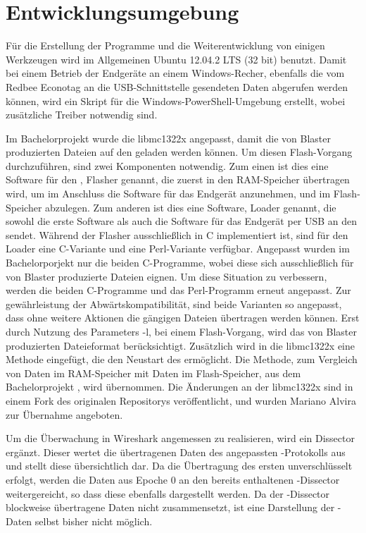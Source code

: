 \section{Entwicklungsumgebung}
\label{sec:entwicklungsumgebung}

Für die Erstellung der Programme und die Weiterentwicklung von einigen Werkzeugen wird im Allgemeinen Ubuntu 12.04.2 LTS (32 bit) benutzt.
Damit bei einem Betrieb der Endgeräte an einem Windows-Recher, ebenfalls die vom Redbee Econotag an die USB-Schnittstelle gesendeten
Daten abgerufen werden können, wird ein Skript für die Windows-PowerShell-Umgebung erstellt, wobei zusätzliche Treiber notwendig sind.

Im Bachelorprojekt  wurde die libmc1322x \cite{libmc1322x} angepasst, damit die von Blaster produzierten Dateien auf den
 geladen werden können. Um diesen Flash-Vorgang durchzuführen, sind zwei Komponenten notwendig. Zum einen ist dies eine
Software für den , Flasher genannt, die zuerst in den RAM-Speicher übertragen wird, um im Anschluss die Software für
das Endgerät anzunehmen, und im Flash-Speicher abzulegen. Zum anderen ist dies eine Software, Loader genannt, die sowohl die erste
Software als auch die Software für das Endgerät per USB an den  sendet. Während der Flasher ausschließlich in C
implementiert ist, sind für den Loader eine C-Variante und eine Perl-Variante verfügbar. Angepasst wurden im Bachelorporjekt 
nur die beiden C-Programme, wobei diese sich ausschließlich für von Blaster produzierte Dateien eignen. Um diese Situation zu verbessern,
werden die beiden C-Programme und das Perl-Programm erneut angepasst. Zur gewährleistung der Abwärtskompatibilität, sind beide Varianten
so angepasst, dass ohne weitere Aktionen die gängigen Dateien übertragen werden können. Erst durch Nutzung des Parameters -l, bei einem
Flash-Vorgang, wird das von Blaster produzierten Dateieformat berücksichtigt. Zusätzlich wird in die libmc1322x eine Methode eingefügt,
die den Neustart des  ermöglicht. Die Methode, zum Vergleich von Daten im RAM-Speicher mit Daten im Flash-Speicher, aus dem
Bachelorprojekt , wird übernommen. Die Änderungen an der libmc1322x sind in einem Fork des originalen Repositorys veröffentlicht,
und wurden Mariano Alvira zur Übernahme angeboten.

Um die Überwachung in Wireshark \cite{wireshark} angemessen zu realisieren, wird ein Dissector ergänzt. Dieser wertet die übertragenen
Daten des angepassten -Protokolls aus und stellt diese übersichtlich dar. Da die Übertragung des ersten 
unverschlüsselt erfolgt, werden die Daten aus Epoche 0 an den bereits enthaltenen -Dissector weitergereicht, so dass
diese ebenfalls dargestellt werden. Da der -Dissector blockweise übertragene Daten nicht zusammensetzt, ist eine Darstellung
der -Daten selbst bisher nicht möglich.

